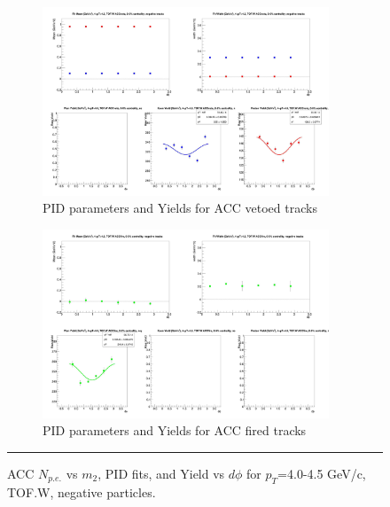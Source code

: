 \begin{figure}[H]
  \ContinuedFloat
    \begin{subfigure}{1\textwidth}
   \centering
   \includegraphics[width=0.94\textwidth]{hiptfits/neg/fitParams_tof2_cent0_ch0_pT-40-45.jpg}
    \caption{PID parameters and Yields for ACC vetoed tracks}
    \end{subfigure}    
    \begin{subfigure}{1\textwidth}
   \centering
   \includegraphics[width=0.94\textwidth]{hiptfits/neg/fitParams_tof3_cent0_ch0_pT-40-45.jpg}
    \caption{PID parameters and Yields for ACC fired tracks}
    \end{subfigure} 
    \rule{35em}{0.5pt}
  \caption[ACC $N_{p.e.}$ vs $m_2$, PID fits, and Yield vs $d\phi$ for $p_T$=4.0-4.5 GeV/c, TOF.W, negative particles.]{ACC $N_{p.e.}$ vs $m_2$, PID fits, and Yield vs $d\phi$ for $p_T$=4.0-4.5 GeV/c, TOF.W, negative particles.}
  \label{fig:acc40-45neg}
\end{figure}


